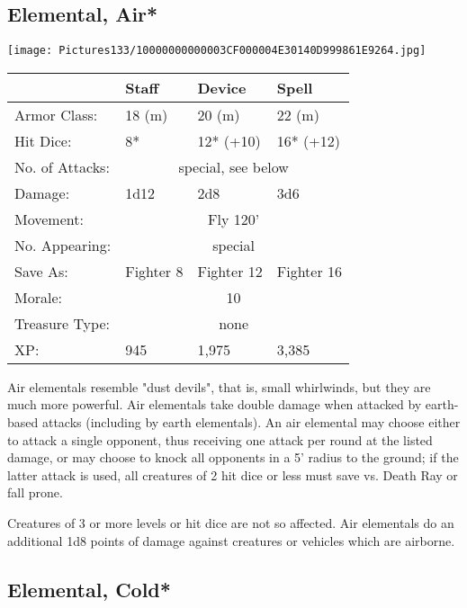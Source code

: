 \documentclass[a4paper,twoside,openany,10pt]{book}
\begin{document}
\begin{multicols}{2}
\subsection*{Elemental, Air*}\label{elemental-air}

\begin{center}
	\texttt{[image: Pictures133/10000000000003CF000004E30140D999861E9264.jpg]}
\end{center}

\begin{tabularx}{0.48\textwidth}[]{@{}lXXX@{}}
& Staff & Device & Spell \\\hline
Armor Class: & 18 (m) & 20 (m) & 22 (m) \\\hline
Hit Dice: & 8* & 12* (+10) & 16* (+12) \\\hline
No. of Attacks: & \multicolumn{3}{c}{special, see below} \\\hline
Damage: & 1d12 & 2d8 & 3d6 \\\hline
Movement: & \multicolumn{3}{c}{Fly 120'} \\\hline
No. Appearing: &  \multicolumn{3}{c}{special} \\\hline
Save As: & Fighter 8 & Fighter 12 & Fighter 16 \\\hline
Morale: & \multicolumn{3}{c}{10} \\\hline
Treasure Type: & \multicolumn{3}{c}{none} \\\hline
XP: & 945 & 1,975 & 3,385 \\\hline
\end{tabularx}\medskip



Air elementals resemble "dust devils", that is, small whirlwinds, but they are much more powerful. Air elementals take double damage when attacked by earth-based attacks (including by earth elementals). An air elemental may choose either to attack a single opponent, thus receiving one attack per round at the listed damage, or may choose to knock all opponents in a 5' radius to the ground; if the latter attack is used, all creatures of 2 hit dice or less must save vs. Death Ray or fall prone. 

Creatures of 3 or more levels or hit dice are not so affected. Air elementals do an additional 1d8 points of damage against creatures or vehicles which are airborne.

\subsection*{Elemental, Cold*}\label{elemental-cold}


\end{multicols}
\end{document}
